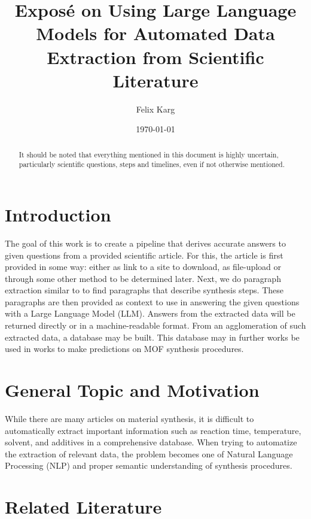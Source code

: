 \documentclass[a4paper,12pt]{article}
\title{Exposé on Using Large Language Models for Automated Data Extraction from Scientific Literature}
\author{Felix Karg}
\date{\today}
\begin{document}
\maketitle

\begin{abstract}
    It should be noted that everything mentioned in this document is highly
    uncertain, particularly scientific questions, steps and timelines, even if
    not otherwise mentioned.

\end{abstract}


\section{Introduction}
The goal of this work is to create a pipeline that derives accurate answers to
given questions from a provided scientific article. For this, the article
is first provided in some way: either as link to a site to download, as
file-upload or through some other method to be determined later. Next, we do
paragraph extraction similar to \cite{luo_mof_2022} to find paragraphs that
describe synthesis steps. These paragraphs are then provided as context to use
in answering the given questions with a Large Language Model (LLM).
Answers from the extracted data will be returned directly or in a
machine-readable format. From an agglomeration of such extracted data, a
database may be built. This database may in further works be used in works to
make predictions on MOF synthesis procedures.


\section{General Topic and Motivation}
While there are many articles on material synthesis, it is difficult to
automatically extract important information such as reaction time, temperature,
solvent, and additives in a comprehensive database. When trying to automatize
the extraction of relevant data, the problem becomes one of Natural Language
Processing (NLP) and proper semantic understanding of synthesis procedures.

\section{Related Literature}
\end{document}
